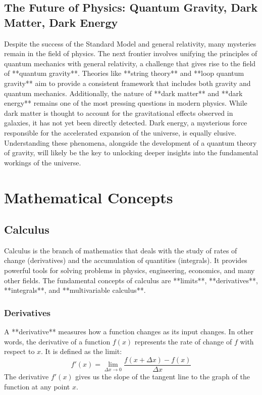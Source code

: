 \documentclass{article}
\begin{document}
\subsection{The Future of Physics: Quantum Gravity, Dark Matter, Dark Energy}

Despite the success of the Standard Model and general relativity, many mysteries remain in the field of physics. The next frontier involves unifying the principles of quantum mechanics with general relativity, a challenge that gives rise to the field of **quantum gravity**. Theories like **string theory** and **loop quantum gravity** aim to provide a consistent framework that includes both gravity and quantum mechanics. Additionally, the nature of **dark matter** and **dark energy** remains one of the most pressing questions in modern physics. While dark matter is thought to account for the gravitational effects observed in galaxies, it has not yet been directly detected. Dark energy, a mysterious force responsible for the accelerated expansion of the universe, is equally elusive. Understanding these phenomena, alongside the development of a quantum theory of gravity, will likely be the key to unlocking deeper insights into the fundamental workings of the universe.


\section{Mathematical Concepts}

\subsection{Calculus}

Calculus is the branch of mathematics that deals with the study of rates of change (derivatives) and the accumulation of quantities (integrals). It provides powerful tools for solving problems in physics, engineering, economics, and many other fields. The fundamental concepts of calculus are **limits**, **derivatives**, **integrals**, and **multivariable calculus**.

\subsubsection*{Derivatives}

A **derivative** measures how a function changes as its input changes. In other words, the derivative of a function \( f(x) \) represents the rate of change of \( f \) with respect to \( x \). It is defined as the limit:
\[
f'(x) = \lim_{\Delta x \to 0} \frac{f(x + \Delta x) - f(x)}{\Delta x}
\]
The derivative \( f'(x) \) gives us the slope of the tangent line to the graph of the function at any point \( x \).
\end{document}
